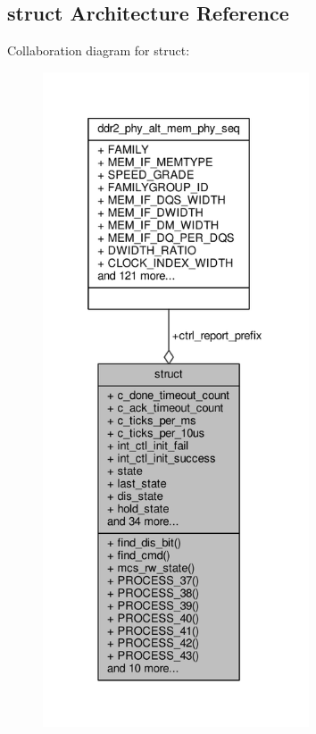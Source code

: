\subsection{struct Architecture Reference}
\label{classddr2__phy__alt__mem__phy__ctrl_1_1struct}


Collaboration diagram for struct\+:\nopagebreak
\begin{figure}[H]
\begin{center}
\leavevmode
\includegraphics[height=550pt]{d8/dc5/classddr2__phy__alt__mem__phy__ctrl_1_1struct__coll__graph}
\end{center}
\end{figure}
